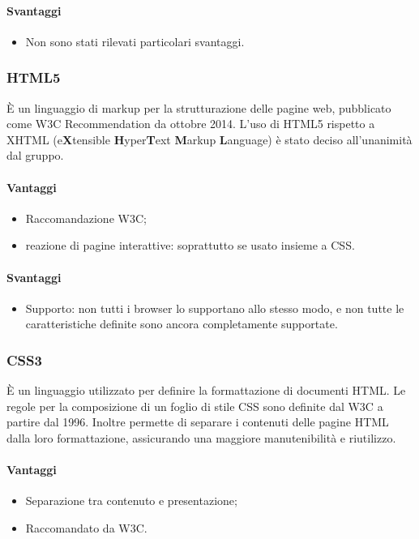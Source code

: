 \paragraph{Svantaggi}
\begin{itemize}
\item Non sono stati rilevati particolari svantaggi.
\end{itemize}

\subsubsection{HTML5}
È un linguaggio di markup per la strutturazione delle pagine web, pubblicato come W3C Recommendation da ottobre 2014. L’uso di HTML5 rispetto a XHTML
(e\textbf{X}tensible \textbf{H}yper\textbf{T}ext \textbf{M}arkup \textbf{L}anguage) è stato deciso all'unanimità dal gruppo.

\paragraph{Vantaggi}
\begin{itemize}
\item Raccomandazione W3C;
\item reazione di pagine interattive: soprattutto se usato insieme a CSS.
\end{itemize}

\paragraph{Svantaggi}
\begin{itemize}
\item Supporto: non tutti i browser lo supportano allo stesso modo, e non tutte le caratteristiche definite sono ancora completamente supportate.
\end{itemize}

\subsubsection{CSS3}
È un linguaggio utilizzato per definire la formattazione di documenti HTML.
Le regole per la composizione di un foglio di stile CSS sono definite dal W3C
a partire dal 1996. Inoltre permette di separare i contenuti delle pagine HTML dalla loro formattazione, assicurando una maggiore manutenibilità e riutilizzo.

\paragraph{Vantaggi}
\begin{itemize}
\item Separazione tra contenuto e presentazione;
\item Raccomandato da W3C.
\end{itemize}
